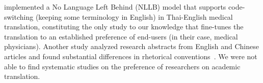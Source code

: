 \citet{pengpun2024creating} implemented a No Language Left Behind (NLLB) model that supports code-switching (keeping some terminology in English) in Thai-English medical translation, constituting the only study to our knowledge that fine-tunes the translation to an established preference of end-users (in their case, medical physicians). Another study analyzed research abstracts from English and Chinese articles and found substantial differences in rhetorical conventions~\citep{li2020mediating}. We were not able to find systematic studies on the preference of researchers on academic translation.